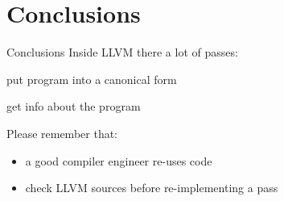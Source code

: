 
\section{Conclusions}
\begin{frame}{Conclusions}
Inside LLVM there a lot of passes:

\begin{description}[normalization]
\item[normalization] put program into a canonical form
\item[analysis] get info about the program
\end{description}

\vfill
Please remember that:
\begin{itemize}
\item a good compiler engineer \alert{re-uses} code
\item check LLVM sources before re-implementing a pass
\end{itemize}
\vfill
\end{frame}